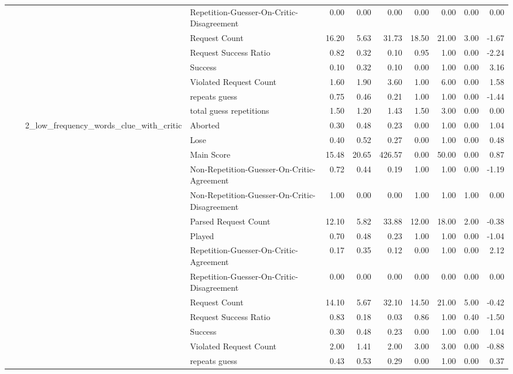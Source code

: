 \begin{tabular}{llllrrrrrrr}
 &  &  & Repetition-Guesser-On-Critic-Disagreement & 0.00 & 0.00 & 0.00 & 0.00 & 0.00 & 0.00 & 0.00 \\
 &  &  & Request Count & 16.20 & 5.63 & 31.73 & 18.50 & 21.00 & 3.00 & -1.67 \\
 &  &  & Request Success Ratio & 0.82 & 0.32 & 0.10 & 0.95 & 1.00 & 0.00 & -2.24 \\
 &  &  & Success & 0.10 & 0.32 & 0.10 & 0.00 & 1.00 & 0.00 & 3.16 \\
 &  &  & Violated Request Count & 1.60 & 1.90 & 3.60 & 1.00 & 6.00 & 0.00 & 1.58 \\
 &  &  & repeats guess & 0.75 & 0.46 & 0.21 & 1.00 & 1.00 & 0.00 & -1.44 \\
 &  &  & total guess repetitions & 1.50 & 1.20 & 1.43 & 1.50 & 3.00 & 0.00 & 0.00 \\
\cline{3-11}
 &  & \multirow[t]{15}{*}{2_low_frequency_words_clue_with_critic} & Aborted & 0.30 & 0.48 & 0.23 & 0.00 & 1.00 & 0.00 & 1.04 \\
 &  &  & Lose & 0.40 & 0.52 & 0.27 & 0.00 & 1.00 & 0.00 & 0.48 \\
 &  &  & Main Score & 15.48 & 20.65 & 426.57 & 0.00 & 50.00 & 0.00 & 0.87 \\
 &  &  & Non-Repetition-Guesser-On-Critic-Agreement & 0.72 & 0.44 & 0.19 & 1.00 & 1.00 & 0.00 & -1.19 \\
 &  &  & Non-Repetition-Guesser-On-Critic-Disagreement & 1.00 & 0.00 & 0.00 & 1.00 & 1.00 & 1.00 & 0.00 \\
 &  &  & Parsed Request Count & 12.10 & 5.82 & 33.88 & 12.00 & 18.00 & 2.00 & -0.38 \\
 &  &  & Played & 0.70 & 0.48 & 0.23 & 1.00 & 1.00 & 0.00 & -1.04 \\
 &  &  & Repetition-Guesser-On-Critic-Agreement & 0.17 & 0.35 & 0.12 & 0.00 & 1.00 & 0.00 & 2.12 \\
 &  &  & Repetition-Guesser-On-Critic-Disagreement & 0.00 & 0.00 & 0.00 & 0.00 & 0.00 & 0.00 & 0.00 \\
 &  &  & Request Count & 14.10 & 5.67 & 32.10 & 14.50 & 21.00 & 5.00 & -0.42 \\
 &  &  & Request Success Ratio & 0.83 & 0.18 & 0.03 & 0.86 & 1.00 & 0.40 & -1.50 \\
 &  &  & Success & 0.30 & 0.48 & 0.23 & 0.00 & 1.00 & 0.00 & 1.04 \\
 &  &  & Violated Request Count & 2.00 & 1.41 & 2.00 & 3.00 & 3.00 & 0.00 & -0.88 \\
 &  &  & repeats guess & 0.43 & 0.53 & 0.29 & 0.00 & 1.00 & 0.00 & 0.37 \\

\end{tabular}
